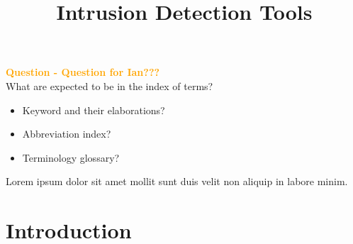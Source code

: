 \documentclass[conference]{IEEEtran}
\newenvironment{question}[1][\unskip]{%
\par
\noindent
\textcolor{orange}{\bfseries{Question - } #1???}
\\ \color{orange}}
{}
\begin{document}
\title{Intrusion Detection Tools\\}

\author{
}


\maketitle




\begin{IEEEkeywords}

  \begin{question}[Question for Ian]
  What are expected to be in the index of terms?

    \begin{itemize}
      \item Keyword and their elaborations?
      \item Abbreviation index?
      \item Terminology glossary?
    \end{itemize}

  \end{question}


Lorem ipsum dolor sit amet mollit sunt duis velit non aliquip in labore minim.


\end{IEEEkeywords}

\section{Introduction}

\end{document}
